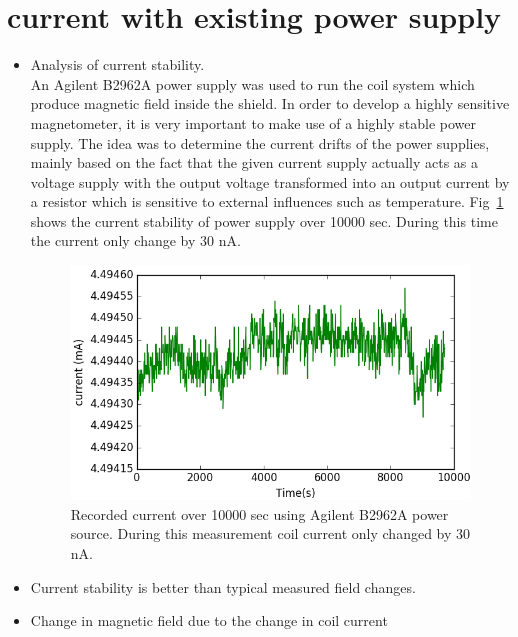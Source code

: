    \section{current with existing power supply}
   \begin{itemize}
   \item Analysis of current stability.\\
 An Agilent B2962A power supply was used to run the coil system which produce magnetic field inside the shield. In order to develop a highly sensitive magnetometer, it is very important to make use of a highly stable power supply. The idea was to determine the current drifts of the power supplies, mainly based on the fact that the given current supply actually acts as a voltage supply with the output voltage transformed into an output current by a resistor which is sensitive to external influences such as temperature. Fig~\ref{fig:current} shows the current stability of power supply over 10000 sec. During this time the current only change by 30 nA.  
   \begin{figure}[h]
\centering
\includegraphics[width=0.8\linewidth]{figures/current}
\caption{Recorded current over 10000 sec using Agilent B2962A power source. During this measurement coil current only changed by 30 nA.\label{fig:current} }
\end{figure}
   \item Current stability is better than typical measured field changes.
   \item Change in magnetic field due to the change in coil current\\

\end{itemize}
